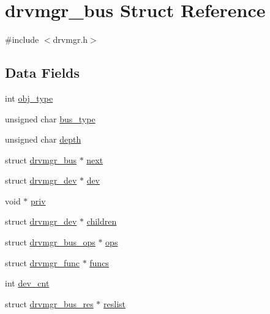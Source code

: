 \hypertarget{structdrvmgr__bus}{}\section{drvmgr\+\_\+bus Struct Reference}
\label{structdrvmgr__bus}


{\ttfamily \#include $<$drvmgr.\+h$>$}

\subsection*{Data Fields}
\begin{DoxyCompactItemize}
\item 
int \mbox{\hyperlink{structdrvmgr__bus_a37a26b8023b60dd1ca46a158a9caa90a}{obj\+\_\+type}}
\item 
unsigned char \mbox{\hyperlink{structdrvmgr__bus_ad7ac15a0b977823ec8fe6b144f232724}{bus\+\_\+type}}
\item 
unsigned char \mbox{\hyperlink{structdrvmgr__bus_a78774b30ceb29cc8b4aa16a7f2352eb4}{depth}}
\item 
struct \mbox{\hyperlink{structdrvmgr__bus}{drvmgr\+\_\+bus}} $\ast$ \mbox{\hyperlink{structdrvmgr__bus_a86229ae3082803255914a6e9facaff01}{next}}
\item 
struct \mbox{\hyperlink{structdrvmgr__dev}{drvmgr\+\_\+dev}} $\ast$ \mbox{\hyperlink{structdrvmgr__bus_a6352e29d34c91a1ad459afe30b1e812b}{dev}}
\item 
void $\ast$ \mbox{\hyperlink{structdrvmgr__bus_a3e61e0a6e6b1fc336e34710482b1f38e}{priv}}
\item 
struct \mbox{\hyperlink{structdrvmgr__dev}{drvmgr\+\_\+dev}} $\ast$ \mbox{\hyperlink{structdrvmgr__bus_adf36f8ff74f0a0dc8bed44aab4812497}{children}}
\item 
struct \mbox{\hyperlink{structdrvmgr__bus__ops}{drvmgr\+\_\+bus\+\_\+ops}} $\ast$ \mbox{\hyperlink{structdrvmgr__bus_a992594c81fca463bb9b84f67979e8a9f}{ops}}
\item 
struct \mbox{\hyperlink{structdrvmgr__func}{drvmgr\+\_\+func}} $\ast$ \mbox{\hyperlink{structdrvmgr__bus_a09cf5ec1ab115e27fa8a6e6b63323cc0}{funcs}}
\item 
int \mbox{\hyperlink{structdrvmgr__bus_a91de472d59f5d1418b638cb256d4c5e5}{dev\+\_\+cnt}}
\item 
struct \mbox{\hyperlink{structdrvmgr__bus__res}{drvmgr\+\_\+bus\+\_\+res}} $\ast$ \mbox{\hyperlink{structdrvmgr__bus_a75c599005800b34c8743d784b63543d9}{reslist}}
\item 

\end{DoxyCompactItemize}
